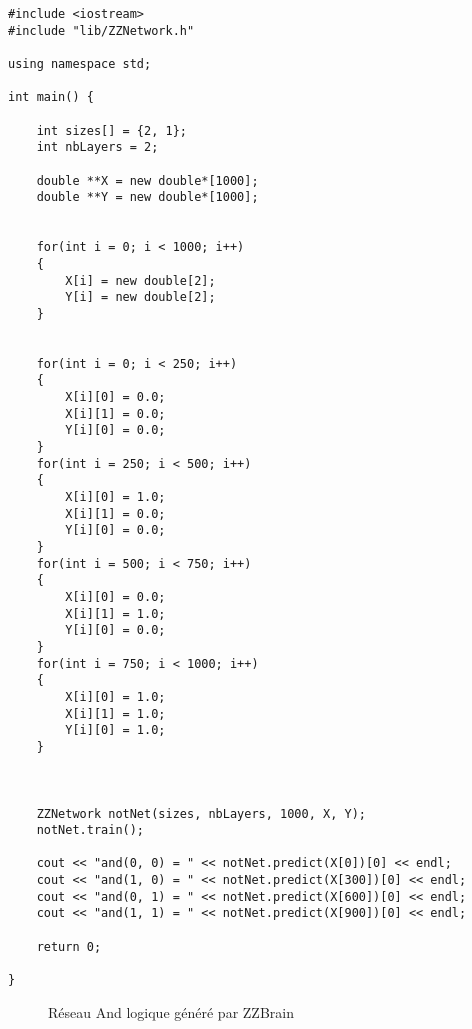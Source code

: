 \begin{verbatim}
#include <iostream>
#include "lib/ZZNetwork.h"

using namespace std;

int main() {

	int sizes[] = {2, 1};
	int nbLayers = 2;

	double **X = new double*[1000];
	double **Y = new double*[1000];


	for(int i = 0; i < 1000; i++)
	{
		X[i] = new double[2];
		Y[i] = new double[2];
	}


	for(int i = 0; i < 250; i++)
	{
		X[i][0] = 0.0;
		X[i][1] = 0.0;
		Y[i][0] = 0.0;
	}
	for(int i = 250; i < 500; i++)
	{
		X[i][0] = 1.0;
		X[i][1] = 0.0;
		Y[i][0] = 0.0;
	}
	for(int i = 500; i < 750; i++)
	{
		X[i][0] = 0.0;
		X[i][1] = 1.0;
		Y[i][0] = 0.0;
	}
	for(int i = 750; i < 1000; i++)
	{
		X[i][0] = 1.0;
		X[i][1] = 1.0;
		Y[i][0] = 1.0;
	}



	ZZNetwork notNet(sizes, nbLayers, 1000, X, Y);
	notNet.train();

	cout << "and(0, 0) = " << notNet.predict(X[0])[0] << endl;
	cout << "and(1, 0) = " << notNet.predict(X[300])[0] << endl;
	cout << "and(0, 1) = " << notNet.predict(X[600])[0] << endl;
	cout << "and(1, 1) = " << notNet.predict(X[900])[0] << endl;

    return 0;

}
\end{verbatim}

\begin{figure}[h]
\centering
    \caption{Réseau And logique généré par ZZBrain}

\end{figure}

